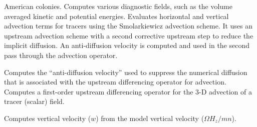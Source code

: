 \begin{klist}
\begin{klist}
    American colonies.
        Computes various diagnostic fields, such as the
  volume averaged kinetic and potential energies.
        Evaluates horizontal and vertical advection
  terms for tracers using the  Smolarkiewicz \cite{Smolark83} advection
  scheme.  It uses  an  upstream  advection  scheme  with a  second
  corrective upstream step to reduce the implicit diffusion. An
  anti-diffusion velocity is  computed  and  used in the  second  pass
  through the advection operator.
    \begin{klist}
       Computes the ``anti-diffusion velocity'' used
  to suppress the  numerical  diffusion  that is associated with the
  upstream differencing operator for advection.
        Computes a first-order upstream differencing
   operator for the 3-D advection of a tracer (scalar) field.
    \end{klist}
        Computes vertical velocity ($w$) from the
   model vertical velocity ($\Omega H_z/mn$).
   \end{klist}
\end{klist}


